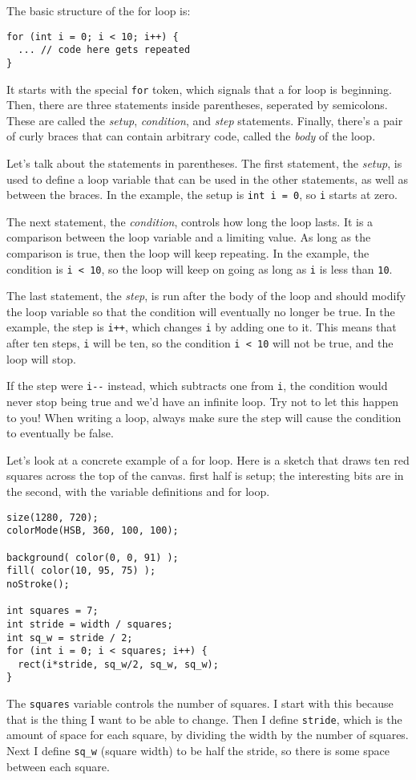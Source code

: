 \documentclass[
]{leaflet}
\begin{document}
The basic structure of the for loop is:
\begin{lstlisting}
for (int i = 0; i < 10; i++) {
  ... // code here gets repeated
}
\end{lstlisting}
It starts with the special \texttt{for} token, which signals that a for loop is beginning.
Then, there are three statements inside parentheses, seperated by semicolons.
These are called the \textit{setup}, \textit{condition}, and \textit{step} statements.
Finally, there's a pair of curly braces that can contain arbitrary code, called the \textit{body} of the loop.

Let's talk about the statements in parentheses.
The first statement, the \textit{setup}, is used to define a loop variable that can be used in the other statements, as well as between the braces.
In the example, the setup is \texttt{int i = 0}, so \texttt{i} starts at zero.

The next statement, the \textit{condition}, controls how long the loop lasts.
It is a comparison between the loop variable and a limiting value.
As long as the comparison is true, then the loop will keep repeating.
In the example, the condition is \texttt{i < 10}, so the loop will keep on going as long as \texttt{i} is less than \texttt{10}.

The last statement, the \textit{step}, is run after the body of the loop and should modify the loop variable so that the condition will eventually no longer be true.
In the example, the step is \texttt{i++}, which changes \texttt{i} by adding one to it.
This means that after ten steps, \texttt{i} will be ten, so the condition \texttt{i < 10} will not be true, and the loop will stop.

If the step were \texttt{i-}\texttt{-} instead, which subtracts one from \texttt{i}, the condition would never stop being true and we'd have an infinite loop.
Try not to let this happen to you!
When writing a loop, always make sure the step will cause the condition to eventually be false.

Let's look at a concrete example of a for loop.
Here is a sketch that draws ten red squares across the top of the canvas.
 first half is setup; the interesting bits are in the second, with the variable definitions and for loop.
\begin{lstlisting}
size(1280, 720);
colorMode(HSB, 360, 100, 100);

background( color(0, 0, 91) );
fill( color(10, 95, 75) );
noStroke();

int squares = 7;
int stride = width / squares;
int sq_w = stride / 2;
for (int i = 0; i < squares; i++) {
  rect(i*stride, sq_w/2, sq_w, sq_w);
}
\end{lstlisting}
The \texttt{squares} variable controls the number of squares.
I start with this because that is the thing I want to be able to change.
Then I define \texttt{stride}, which is the amount of space for each square, by dividing the width by the number of squares.
Next I define \texttt{sq\_w} (square width) to be half the stride, so there is some space between each square.
\end{document}
